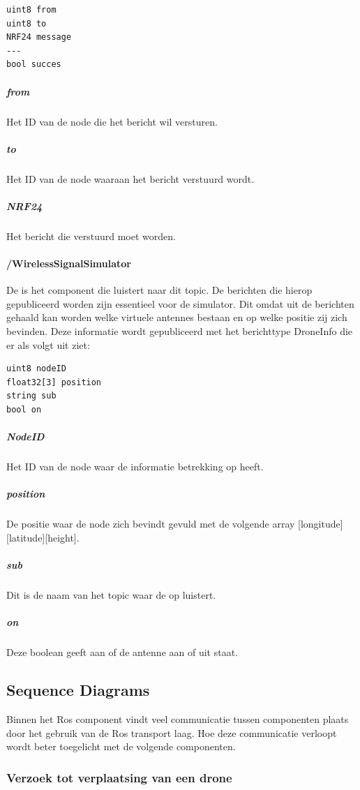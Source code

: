 \documentclass[a4paper, 11pt, oneside]{report}
\begin{document}
\begin{lstlisting}
uint8 from
uint8 to 
NRF24 message
---
bool succes
\end{lstlisting}

\subparagraph{from} Het ID van de node die het bericht wil versturen.
\subparagraph{to} Het ID van de node waaraan het bericht verstuurd wordt.
\subparagraph{NRF24} Het bericht die verstuurd moet worden.


\paragraph{/WirelessSignalSimulator}
\label{DetailedDesign:ros:intern:rosinterfaces:topic:signalsimulator}
De  is het component die luistert naar dit topic. 
De berichten die hierop gepubliceerd worden zijn essentieel voor de simulator.
Dit omdat uit de berichten gehaald kan worden welke virtuele antennes bestaan en op welke positie zij zich bevinden.
Deze informatie wordt gepubliceerd met het berichttype DroneInfo die er als volgt uit ziet:

\begin{lstlisting}
uint8 nodeID
float32[3] position
string sub
bool on
\end{lstlisting}

\subparagraph{NodeID} Het ID van de node waar de informatie betrekking op heeft.
\subparagraph{position} De positie waar de node zich bevindt gevuld met de volgende array [longitude][latitude][height].
\subparagraph{sub} Dit is de naam van het topic waar de  op luistert.
\subparagraph{on} Deze boolean geeft aan of de antenne aan of uit staat.

\subsection{Sequence Diagrams}
\label{DetailedDesign:ros:sequence}

Binnen het Ros component vindt veel communicatie tussen componenten plaats door het gebruik van de Ros transport laag.
Hoe deze communicatie verloopt wordt beter toegelicht met de volgende componenten.

\subsubsection{Verzoek tot verplaatsing van een drone}
\label{DetailedDesign:ros:sequence:verplaatsingdrone}
\end{document}
